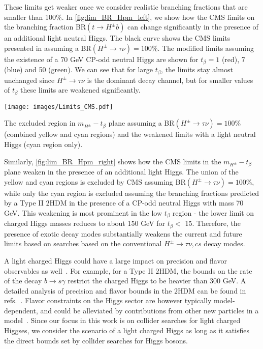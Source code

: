 These limits get weaker once we consider realistic branching fractions that are smaller than 100\%. In \autoref{fig:lim_BR_Hpm_left}, we show how the CMS limits on the branching fraction BR$(t \rightarrow H^{\pm} b)$ can change significantly in the presence of an additional light neutral Higgs. The black curve shows the CMS limits presented in \cite{CMS:2014cdp} assuming a BR$(H^{\pm} \rightarrow \tau \nu) = 100\%$. The modified limits assuming the existence of a 70 GeV CP-odd neutral Higgs are shown for $t_{\beta}=1$ (red), 7 (blue) and 50 (green). We can see that for large $t_{\beta}$, the limits stay almost unchanged since $H^{\pm} \rightarrow \tau \nu$ is the dominant decay channel, but for smaller values of $t_{\beta}$ these limits are weakened significantly.

\begin{marginfigure}[2in]
 	\texttt{[image: images/Limits\_CMS.pdf]}
    \caption{The excluded region in $m_{H^\pm}-t_{\beta}$ plane assuming a BR$(H^{\pm} \rightarrow \tau \nu) = 100\%$ (combined yellow and cyan regions) and the weakened limits with a light neutral Higgs (cyan region only).}
\label{fig:lim_BR_Hpm_right}
\end{marginfigure}

Similarly, \autoref{fig:lim_BR_Hpm_right} shows how the CMS limits in the $m_{H^{\pm}}-t_{\beta}$ plane weaken in the presence of an additional light Higgs. The union of the yellow and cyan regions is excluded by CMS assuming BR$(H^{\pm} \rightarrow \tau \nu) = 100\%$, while only the cyan region is excluded assuming the branching fractions predicted by a Type II $2$HDM in the presence of a CP-odd neutral Higgs with mass 70 GeV. This weakening is most prominent in the low $t_\beta$ region - the lower limit on charged Higgs masses reduces to about 150 GeV for $t_{\beta}<$ 15. Therefore, the presence of exotic decay modes substantially weakens the current and future limits based on searches based on the conventional $H^{\pm} \rightarrow \tau \nu, cs$ decay modes. 

A light charged Higgs could have a large impact on precision and flavor observables as well~\cite{Olive2016}. For example, for a Type II $2$HDM, the bounds on the rate of the decay $b\rightarrow s\gamma$ restrict the charged Higgs to be heavier than 300 GeV. A detailed analysis of precision and flavor bounds in the $2$HDM can be found in refs.~\cite{Coleppa:2013dya,Mahmoudi:2009zx}. Flavor constraints on the Higgs sector are however typically model-dependent, and could be alleviated by contributions from other new particles in a model~\cite{Han:2013mga}. Since our focus in this work is on collider searches for light charged Higgses, we consider the scenario of a light charged Higgs as long as it satisfies the direct bounds set by collider searches for Higgs bosons.

